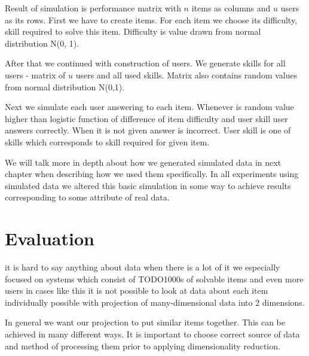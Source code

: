 \documentclass[
  digital, %
  table,   %
  nolof,     %
  nolot,     %
  nocover
]{fithesis3}
\begin{document}
Result of simulation is performance matrix with $n$ items as columns and $u$ users as its rows. First we have to create items. For each item we choose its difficulty, skill required to solve this item. Difficulty is value drawn from normal distribution N(0, 1).

After that we continued with construction of users. We generate skills for all users - matrix of $u$ users and all used skills. Matrix also contains random values from normal distribution N(0,1).

Next we simulate each user answering to each item. Whenever is random value higher than logistic function of difference of item difficulty and user skill user answers correctly. When it is not given answer is incorrect. User skill is one of skills which corresponds to skill required for given item.

We will talk more in depth about how we generated simulated data in next chapter when describing how we used them specifically. In all experiments using simulated data we altered this basic simulation in some way to achieve results corresponding to some attribute of real data.

\chapter{Evaluation}




it is hard to say anything about data when there is a lot of it we
especially focused on systems which consist of TODO1000s of solvable
items and even more users in cases like this it is not possible to look
at data about each item individually possible with projection of
many-dimensional data into 2 dimensions.


In general we want our projection to put similar items together. This
can be achieved in many different ways. It is important to choose
correct source of data and method of processing them prior to applying
dimensionality reduction.

\end{document}
